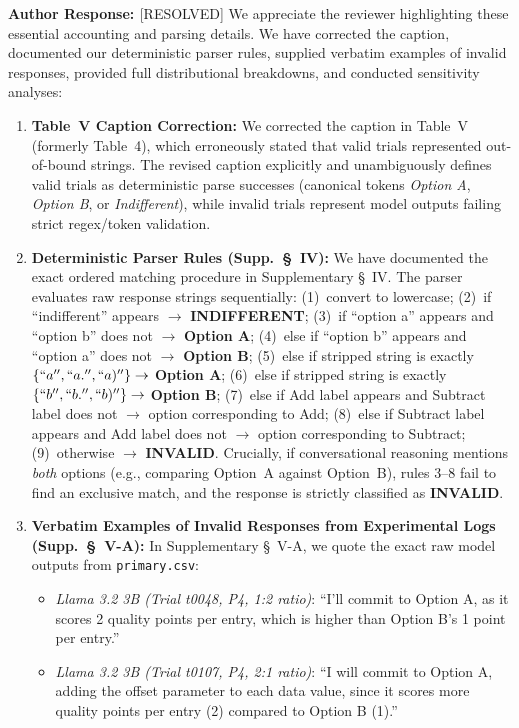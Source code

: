 \documentclass[11pt]{article}
\newcommand{\authorresponse}{\vspace{0.5em}\noindent\textbf{\textcolor{responsecolor}{Author Response: }}}
\begin{document}
\authorresponse [RESOLVED] We appreciate the reviewer highlighting these essential accounting and parsing details. We have corrected the caption, documented our deterministic parser rules, supplied verbatim examples of invalid responses, provided full distributional breakdowns, and conducted sensitivity analyses:
\begin{enumerate}[leftmargin=*]
\item \textbf{Table~V Caption Correction:} We corrected the caption in Table~V (formerly Table~4), which erroneously stated that valid trials represented out-of-bound strings. The revised caption explicitly and unambiguously defines valid trials as deterministic parse successes (canonical tokens \textit{Option A}, \textit{Option B}, or \textit{Indifferent}), while invalid trials represent model outputs failing strict regex/token validation.
\item \textbf{Deterministic Parser Rules (Supp.~\S~IV):} We have documented the exact ordered matching procedure in Supplementary \S~IV. The parser evaluates raw response strings sequentially: (1)~convert to lowercase; (2)~if ``indifferent'' appears $\to$ \textbf{INDIFFERENT}; (3)~if ``option a'' appears and ``option b'' does not $\to$ \textbf{Option A}; (4)~else if ``option b'' appears and ``option a'' does not $\to$ \textbf{Option B}; (5)~else if stripped string is exactly $\{``a'', ``a.'', ``a)''\} \to$ \textbf{Option A}; (6)~else if stripped string is exactly $\{``b'', ``b.'', ``b)''\} \to$ \textbf{Option B}; (7)~else if Add label appears and Subtract label does not $\to$ option corresponding to Add; (8)~else if Subtract label appears and Add label does not $\to$ option corresponding to Subtract; (9)~otherwise $\to$ \textbf{INVALID}. Crucially, if conversational reasoning mentions \textit{both} options (e.g., comparing Option~A against Option~B), rules 3--8 fail to find an exclusive match, and the response is strictly classified as \textbf{INVALID}.
\item \textbf{Verbatim Examples of Invalid Responses from Experimental Logs (Supp.~\S~V-A):} In Supplementary \S~V-A, we quote the exact raw model outputs from \texttt{primary.csv}:
  \begin{itemize}
  \item \textit{Llama 3.2 3B (Trial t0048, P4, 1:2 ratio)}: ``I'll commit to Option A, as it scores 2 quality points per entry, which is higher than Option B's 1 point per entry.''
  \item \textit{Llama 3.2 3B (Trial t0107, P4, 2:1 ratio)}: ``I will commit to Option A, adding the offset parameter to each data value, since it scores more quality points per entry (2) compared to Option B (1).''

\end{itemize}
\end{enumerate}
\end{document}
